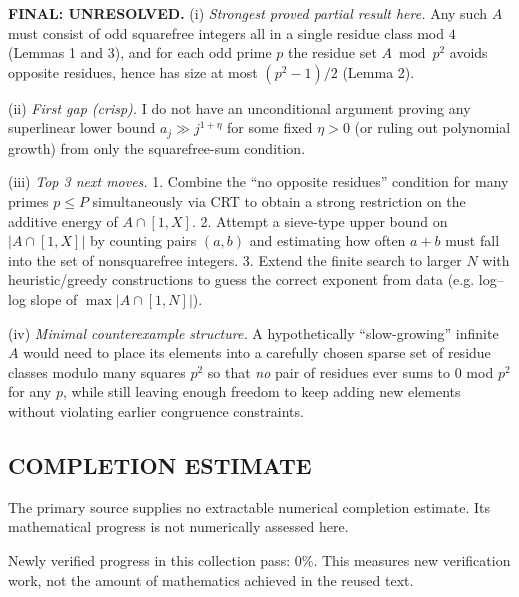 \medskip
\noindent\textbf{FINAL: \textbf{UNRESOLVED}.}
(i) \emph{Strongest proved partial result here.} Any such $A$ must consist of odd squarefree integers all in a single residue class mod $4$ (Lemmas 1 and 3), and for each odd prime $p$ the residue set $A\bmod p^2$ avoids opposite residues, hence has size at most $(p^2-1)/2$ (Lemma 2).

(ii) \emph{First gap (crisp).} I do not have an unconditional argument proving any superlinear lower bound $a_j\gg j^{1+\eta}$ for some fixed $\eta>0$ (or ruling out polynomial growth) from only the squarefree-sum condition.

(iii) \emph{Top 3 next moves.}
1. Combine the ``no opposite residues'' condition for many primes $p\le P$ simultaneously via CRT to obtain a strong restriction on the additive energy of $A\cap[1,X]$.
2. Attempt a sieve-type upper bound on $|A\cap[1,X]|$ by counting pairs $(a,b)$ and estimating how often $a+b$ must fall into the set of nonsquarefree integers.
3. Extend the finite search to larger $N$ with heuristic/greedy constructions to guess the correct exponent from data (e.g. log--log slope of $\max|A\cap[1,N]|$).

(iv) \emph{Minimal counterexample structure.} A hypothetically ``slow-growing'' infinite $A$ would need to place its elements into a carefully chosen sparse set of residue classes modulo many squares $p^2$ so that \emph{no} pair of residues ever sums to $0$ mod $p^2$ for any $p$, while still leaving enough freedom to keep adding new elements without violating earlier congruence constraints.




\subsection*{COMPLETION ESTIMATE}
The primary source supplies no extractable numerical completion estimate. Its mathematical progress is not numerically assessed here.

Newly verified progress in this collection pass: $0\%$. This measures new verification work, not the amount of mathematics achieved in the reused text.
